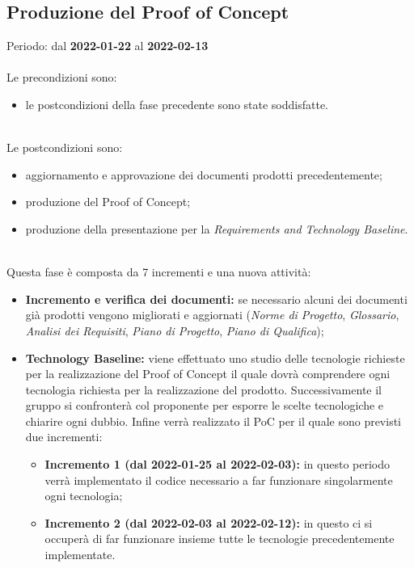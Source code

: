 \subsection{Produzione del Proof of Concept}
Periodo: dal \textbf{2022-01-22} al \textbf{2022-02-13}  \mbox{} \\ \mbox{} \\
Le precondizioni sono:
\begin{itemize}
    \item le postcondizioni della fase precedente sono state soddisfatte.
\end{itemize}  \mbox{} \\
Le postcondizioni sono:
\begin{itemize}
    \item aggiornamento e approvazione dei documenti prodotti precedentemente;
    \item produzione del Proof of Concept;
    \item produzione della presentazione per la \textit{Requirements and Technology Baseline}.
\end{itemize} \mbox{} \\
Questa fase è composta da 7 incrementi e una nuova attività:
\begin{itemize}
    \item \textbf{Incremento e verifica dei documenti:} se necessario alcuni dei documenti già
    prodotti vengono migliorati e aggiornati (\textit{Norme di Progetto}, \textit{Glossario},
    \textit{Analisi dei Requisiti}, \textit{Piano di Progetto}, \textit{Piano di Qualifica});
    \item \textbf{Technology Baseline:} viene effettuato uno studio delle tecnologie richieste per la realizzazione del Proof of Concept il quale dovrà comprendere ogni tecnologia richiesta per la realizzazione del prodotto. Successivamente il gruppo si confronterà col proponente per esporre le scelte tecnologiche e chiarire ogni dubbio. Infine verrà realizzato il PoC per il quale sono previsti due incrementi:
    \begin{itemize}
        \item \textbf{Incremento 1 (dal 2022-01-25 al 2022-02-03):} in questo periodo verrà implementato il codice necessario a far funzionare singolarmente ogni tecnologia;
        \item \textbf{Incremento 2 (dal 2022-02-03 al 2022-02-12):} in questo ci si occuperà di far funzionare insieme tutte le tecnologie precedentemente implementate.
    \end{itemize}
\end{itemize}

